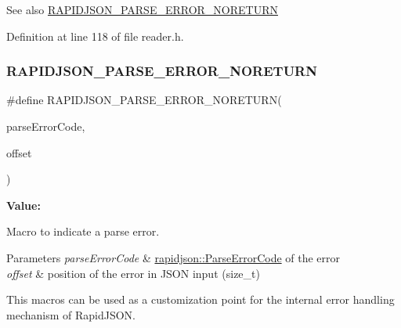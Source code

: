 \begin{DoxySeeAlso}{See also}
\mbox{\hyperlink{group___r_a_p_i_d_j_s_o_n___e_r_r_o_r_s_ga7f8c4265b2edda78568ae3338aaf1461}{R\+A\+P\+I\+D\+J\+S\+O\+N\+\_\+\+P\+A\+R\+S\+E\+\_\+\+E\+R\+R\+O\+R\+\_\+\+N\+O\+R\+E\+T\+U\+RN}} 
\end{DoxySeeAlso}


Definition at line 118 of file reader.\+h.

\mbox{\label{group___r_a_p_i_d_j_s_o_n___e_r_r_o_r_s_ga7f8c4265b2edda78568ae3338aaf1461}} 
\subsubsection{\texorpdfstring{RAPIDJSON\_PARSE\_ERROR\_NORETURN}{RAPIDJSON\_PARSE\_ERROR\_NORETURN}}
{\footnotesize\ttfamily \#define R\+A\+P\+I\+D\+J\+S\+O\+N\+\_\+\+P\+A\+R\+S\+E\+\_\+\+E\+R\+R\+O\+R\+\_\+\+N\+O\+R\+E\+T\+U\+RN(\begin{DoxyParamCaption}\item[{}]{parse\+Error\+Code,  }\item[{}]{offset }\end{DoxyParamCaption})}

{\bfseries Value\+:}
\begin{DoxyCode}{0}

\end{DoxyCode}


Macro to indicate a parse error. 


\begin{DoxyParams}{Parameters}
{\em parse\+Error\+Code} & \mbox{\hyperlink{group___r_a_p_i_d_j_s_o_n___e_r_r_o_r_s_ga7d3acf640886b1f2552dc8c4cd6dea60}{rapidjson\+::\+Parse\+Error\+Code}} of the error \\
\hline
{\em offset} & position of the error in J\+S\+ON input ({\ttfamily size\+\_\+t})\\
\hline
\end{DoxyParams}
This macros can be used as a customization point for the internal error handling mechanism of Rapid\+J\+S\+ON.

